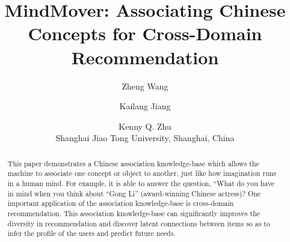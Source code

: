 \documentclass[letterpaper]{article}
\begin{document}
%
\title{MindMover: Associating Chinese \\Concepts for Cross-Domain Recommendation}
\author{Zheng Wang \and Kailang Jiang \and Kenny Q. Zhu\\
Shanghai Jiao Tong University, Shanghai, China\\
\mailsa
}
\maketitle
\begin{abstract}
This paper demonstrates a Chinese association knowledge-base which
allows the machine to associate one concept or object to another, just like how
imagination runs in a human mind.
For example, it is able to answer the question,
``What do you have in mind when you think about ``Gong Li'' (award-winning
Chinese actress)?
One important application of the association knowledge-base is cross-domain
recommendation. This association knowledge-base can significantly improves
the diversity in recommendation and discover latent connections between items
so as to infer the profile of the users and predict future needs.
\end{abstract}





%


\end{document}
